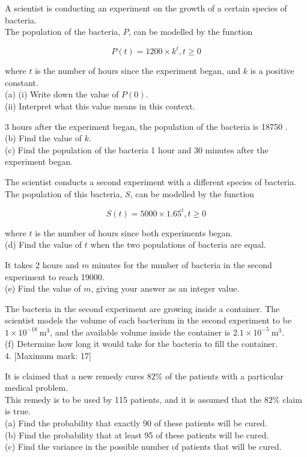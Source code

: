 \documentclass[10pt]{article}
\begin{document}
A scientist is conducting an experiment on the growth of a certain species of bacteria.\\
The population of the bacteria, $P$, can be modelled by the function

$$
P(t)=1200 \times k^{t}, t \geq 0
$$

where $t$ is the number of hours since the experiment began, and $k$ is a positive constant.\\
(a) (i) Write down the value of $P(0)$.\\
(ii) Interpret what this value means in this context.

3 hours after the experiment began, the population of the bacteria is 18750 .\\
(b) Find the value of $k$.\\
(c) Find the population of the bacteria 1 hour and 30 minutes after the experiment began.

The scientist conducts a second experiment with a different species of bacteria. The population of this bacteria, $S$, can be modelled by the function

$$
S(t)=5000 \times 1.65^{t}, t \geq 0
$$

where $t$ is the number of hours since both experiments began.\\
(d) Find the value of $t$ when the two populations of bacteria are equal.

It takes 2 hours and $m$ minutes for the number of bacteria in the second experiment to reach 19000.\\
(e) Find the value of $m$, giving your answer as an integer value.

The bacteria in the second experiment are growing inside a container. The scientist models the volume of each bacterium in the second experiment to be $1 \times 10^{-18} \mathrm{~m}^{3}$, and the available volume inside the container is $2.1 \times 10^{-5} \mathrm{~m}^{3}$.\\
(f) Determine how long it would take for the bacteria to fill the container.\\[0pt]
4. [Maximum mark: 17]

It is claimed that a new remedy cures $82 \%$ of the patients with a particular medical problem.\\
This remedy is to be used by 115 patients, and it is assumed that the $82 \%$ claim is true.\\
(a) Find the probability that exactly 90 of these patients will be cured.\\
(b) Find the probability that at least 95 of these patients will be cured.\\
(c) Find the variance in the possible number of patients that will be cured.
\end{document}
